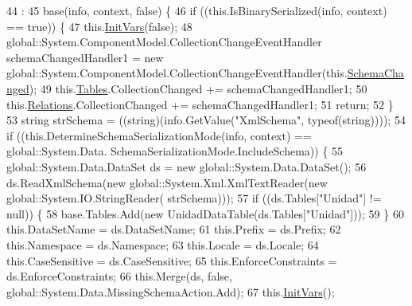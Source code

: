 \begin{DoxyCode}
44                                                                                                            
                                              : 
45                 base(info, context, \textcolor{keyword}{false}) \{
46             \textcolor{keywordflow}{if} ((this.IsBinarySerialized(info, context) == \textcolor{keyword}{true})) \{
47                 this.\hyperlink{class_proyecto___integrador__3_1_1ds_unidad_a264991defd8f2856787ed46e2f0a3881}{InitVars}(\textcolor{keyword}{false});
48                 global::System.ComponentModel.CollectionChangeEventHandler schemaChangedHandler1 = \textcolor{keyword}{new} 
      global::System.ComponentModel.CollectionChangeEventHandler(this.\hyperlink{class_proyecto___integrador__3_1_1ds_unidad_a11ade5cd6b1b18f1ee25ffc978b6575b}{SchemaChanged});
49                 this.\hyperlink{class_proyecto___integrador__3_1_1ds_unidad_ac3f1357f878bf8848284f29737f47276}{Tables}.CollectionChanged += schemaChangedHandler1;
50                 this.\hyperlink{class_proyecto___integrador__3_1_1ds_unidad_a4341745873b49fbaa39cd3562161c504}{Relations}.CollectionChanged += schemaChangedHandler1;
51                 \textcolor{keywordflow}{return};
52             \}
53             \textcolor{keywordtype}{string} strSchema = ((string)(info.GetValue(\textcolor{stringliteral}{"XmlSchema"}, typeof(\textcolor{keywordtype}{string}))));
54             \textcolor{keywordflow}{if} ((this.DetermineSchemaSerializationMode(info, context) == global::System.Data.
      SchemaSerializationMode.IncludeSchema)) \{
55                 global::System.Data.DataSet ds = \textcolor{keyword}{new} global::System.Data.DataSet();
56                 ds.ReadXmlSchema(\textcolor{keyword}{new} global::System.Xml.XmlTextReader(\textcolor{keyword}{new} global::System.IO.StringReader(
      strSchema)));
57                 \textcolor{keywordflow}{if} ((ds.Tables[\textcolor{stringliteral}{"Unidad"}] != null)) \{
58                     base.Tables.Add(\textcolor{keyword}{new} UnidadDataTable(ds.Tables[\textcolor{stringliteral}{"Unidad"}]));
59                 \}
60                 this.DataSetName = ds.DataSetName;
61                 this.Prefix = ds.Prefix;
62                 this.Namespace = ds.Namespace;
63                 this.Locale = ds.Locale;
64                 this.CaseSensitive = ds.CaseSensitive;
65                 this.EnforceConstraints = ds.EnforceConstraints;
66                 this.Merge(ds, \textcolor{keyword}{false}, global::System.Data.MissingSchemaAction.Add);
67                 this.\hyperlink{class_proyecto___integrador__3_1_1ds_unidad_a264991defd8f2856787ed46e2f0a3881}{InitVars}();

\end{DoxyCode}
